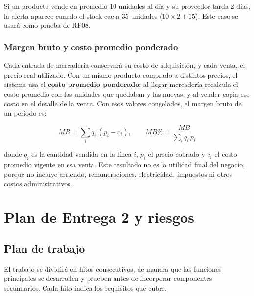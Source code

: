 \documentclass[10pt,a4paper]{article}
\begin{document}
Si un producto vende en promedio 10 unidades al día y su proveedor tarda 2 días, la alerta aparece cuando el stock cae a 35 unidades ($10 \times 2 + 15$). Este caso se usará como prueba de RF08.

\subsubsection{Margen bruto y costo promedio ponderado}
\label{sec:margen}

Cada entrada de mercadería conservará su costo de adquisición, y cada venta, el precio real utilizado. Con un mismo producto comprado a distintos precios, el sistema usa el \textbf{costo promedio ponderado}: al llegar mercadería recalcula el costo promedio con las unidades que quedaban y las nuevas, y al vender copia ese costo en el detalle de la venta. Con esos valores congelados, el margen bruto de un período es:

\begin{equation}
MB = \sum_i q_i\,(p_i - c_i), \qquad MB\% = \frac{MB}{\sum_i q_i\,p_i}
\end{equation}

donde $q_i$ es la cantidad vendida en la línea $i$, $p_i$ el precio cobrado y $c_i$ el costo promedio vigente en esa venta. Este resultado no es la utilidad final del negocio, porque no incluye arriendo, remuneraciones, electricidad, impuestos ni otros costos administrativos.

\section{Plan de Entrega 2 y riesgos}

\subsection{Plan de trabajo}

El trabajo se dividirá en hitos consecutivos, de manera que las funciones principales se desarrollen y prueben antes de incorporar componentes secundarios. Cada hito indica los requisitos que cubre.
\end{document}
